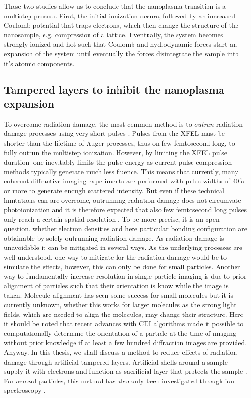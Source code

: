 These two studies allow us to conclude that the nanoplasma transition is a multistep process. First, the initial ionization occurs, followed by an increased Coulomb potential that traps electrons, which then change the structure of the nanosample, e.g. compression of a lattice. Eventually, the system becomes strongly ionized and hot such that Coulomb and hydrodynamic forces start an expansion of the system until eventually the forces disintegrate the sample into it's atomic components.
%
%
%
\subsection{Tampered layers to inhibit the nanoplasma expansion}
%
%
To overcome radiation damage, the most common method is to \textit{outrun} radiation damage processes using very short pulses \citep{Neutze-2000-Nature}. Pulses from the XFEL must be shorter than the lifetime of Auger processes, thus on few femtosecond long, to fully outrun the multistep ionization. However, by limiting the XFEL pulse duration, one inevitably limits the pulse energy as current pulse compression methods typically generate much less fluence. This means that currently, many coherent diffractive imaging experiments are performed with pulse widths of 40fs or more to generate enough scattered intensity. But even if these technical limitations can are overcome, outrunning radiation damage does not circumvate photoionization and it is therefore expected that also few femtosecond long pulses only reach a certain spatial resolution \citep{Aquila-2015-StrucDyn}. To be more precise, it is an open question, whether electron densities and here particular bonding configuration are obtainable by solely outrunning radiation damage. As radiation damage is unavoidable it can be mitigated in several ways. As the underlying processes are well understood, one way to mitigate for the radiation damage would be to simulate the effects, however, this can only be done for small particles. Another way to fundamentally increase resolution in single particle imaging is due to prior alignment of particles such that their orientation is know while the image is taken. Molecule alignment has seen some success for small molecules \citep{Kupper-2014-PRL} but it is currently unknown, whether this works for larger molecules as the strong light fields, which are needed to align the molecules, may change their structure. Here it should be noted that recent advances with CDI algorithms made it possible to computationally determine the orientation of a particle at the time of imaging \citep{Loh-2009-PRE,Ekeberg-2015-PRL} without prior knowledge if at least a few hundred diffraction images are provided. Anyway. In this thesis, we shall discuss a method to reduce effects of radiation damage through artificial tampered layers. Artificial shells around a sample supply it with electrons and function as sacrificial layer that protects the sample \citep{Hau-Riege-2010-PRL}. For aerosol particles, this method has also only been investigated through ion spectroscopy \citep{Hoener-2008-JPB,Ziemkewitz-2017-unpublished}.
